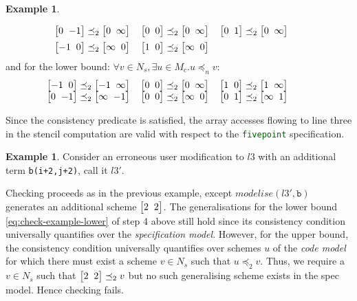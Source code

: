 \documentclass[10pt,preprint]{sigplanconf}
\newcounter{block}
\theoremstyle{definition}
\newtheorem{example}[block]{Example}
\newcommand{\vtwoh}[2]{\setlength{\arraycolsep}{0em}
\left[\begin{array}{cc}#1 \; & \; #2\end{array}\right]}
\begin{document}
\begin{example}
\begin{enumerate}
\begin{align}
\begin{array}{l}
   \hspace{-1.5em}
     \vtwoh{0}{-1} \preceq_2 \vtwoh{0}{\infty} \quad
     \vtwoh{0}{0} \preceq_2 \vtwoh{0}{\infty} \quad
     \vtwoh{0}{1} \preceq_2 \vtwoh{0}{\infty} \\[0.5em]
        \hspace{-1.5em}\vtwoh{-1}{0} \preceq_2 \vtwoh{\infty}{0} \quad
     \vtwoh{1}{0} \preceq_2 \vtwoh{\infty}{0}
     \end{array}
  \label{eq:check-example-upper}
  \end{align}
  and for the lower bound: $\forall v \in N_s, \exists u \in M_c . u
  \preceq_n v$:
  \begin{align}
    \hspace{-1em}
    \begin{array}{l}
     \hspace{-1.3em}\vtwoh{-1}{0} \preceq_2 \vtwoh{-1}{\infty} \quad
     \vtwoh{0}{0} \preceq_2 \vtwoh{0}{\infty} \quad
     \vtwoh{1}{0} \preceq_2 \vtwoh{1}{\infty}  \\
     \hspace{-1.3em}\vtwoh{0}{-1}  \preceq_2 \vtwoh{\infty}{-1} \quad
     \vtwoh{0}{0}  \preceq_2 \vtwoh{\infty}{0} \quad
     \vtwoh{0}{1}  \preceq_2 \vtwoh{\infty}{1}
     \end{array}
    \label{eq:check-example-lower}
  \end{align}
\end{enumerate}
Since the consistency predicate is satisfied, the array
  accesses flowing to line three in the stencil computation are valid
  with respect to the {\textcolor{darkgreen}{\texttt{fivepoint}}} specification.
\end{example}
\begin{example}
Consider an erroneous user modification to $l3$ with an
additional term \texttt{b(i+2,j+2)}, call it $l3'$.%
%

Checking proceeds as in the previous example, except
$\mathit{modelise}(l3',\texttt{b})$ generates an additional scheme
$\vtwoh{2}{2}$. The generalisations for
the lower bound \eqref{eq:check-example-lower}
of step 4 above still hold since its consistency condition
universally quantifies over the \emph{specification model}. However, for
the upper bound, the consistency condition universally quantifies
over schemes $u$ of the \emph{code model} for which there must exist
a scheme $v \in N_s$ such that $u \preceq_2 v$. Thus, we require a $v
\in N_s$ such that $\vtwoh{2}{2} \preceq_2 v$ but no such generalising
scheme exists in the spec model. Hence checking fails.
\end{example}
\end{document}
